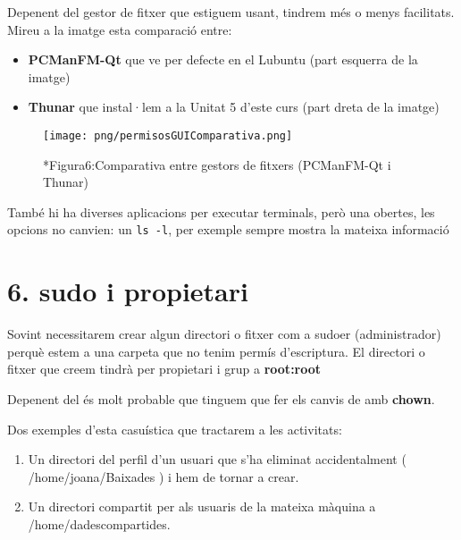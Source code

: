 \documentclass[
  a4paper,
]{article}
\providecommand{\tightlist}{%
  \setlength{\itemsep}{0pt}\setlength{\parskip}{0pt}}
\begin{document}
Depenent del gestor de fitxer que estiguem usant, tindrem més o menys
facilitats. Mireu a la imatge esta comparació entre:

\begin{itemize}
\tightlist
\item
  \textbf{PCManFM-Qt} que ve per defecte en el Lubuntu (part esquerra de
  la imatge)
\item
  \textbf{Thunar} que instal·lem a la Unitat 5 d'este curs (part dreta
  de la imatge)
\end{itemize}

\begin{figure}
\centering
\texttt{[image: png/permisosGUIComparativa.png]}
\caption{*Figura6:Comparativa entre gestors de fitxers (PCManFM-Qt i
Thunar)}
\end{figure}

També hi ha diverses aplicacions per executar terminals, però una
obertes, les opcions no canvien: un \texttt{ls\ -l}, per exemple sempre
mostra la mateixa informació

\section{6. sudo i propietari}\label{sudo-i-propietari}

Sovint necessitarem crear algun directori o fitxer com a sudoer
(administrador) perquè estem a una carpeta que no tenim permís
d'escriptura. El directori o fitxer que creem tindrà per propietari i
grup a \textbf{root:root}

Depenent del és molt probable que tinguem que fer els canvis de amb
\textbf{chown}.

Dos exemples d'esta casuística que tractarem a les activitats:

\begin{enumerate}
\def\labelenumi{\arabic{enumi}.}
\item
  Un directori del perfil d'un usuari que s'ha eliminat accidentalment (
  /home/joana/Baixades ) i hem de tornar a crear.
\item
  Un directori compartit per als usuaris de la mateixa màquina a
  /home/dadescompartides.
\end{enumerate}
\end{document}
